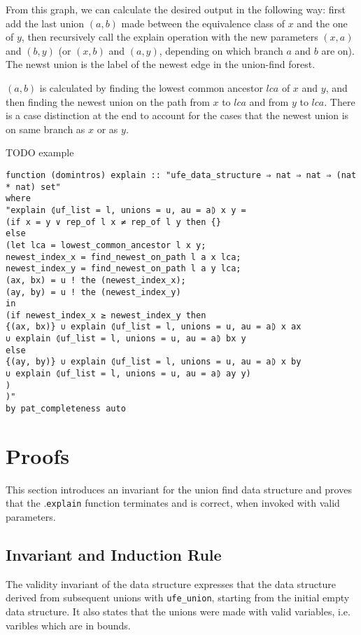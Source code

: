 From this graph, we can calculate the desired output in the following way: first add the last union $(a, b)$ made between the equivalence class of $x$ and the one of $y$, then recursively call the explain operation with the new parameters $(x, a)$ and $(b, y)$ (or $(x, b)$ and $(a, y)$, depending on which branch $a$ and $b$ are on). The newst union is the label of the newest edge in the union-find forest.

$(a, b)$ is calculated by finding the lowest common ancestor $lca$ of $x$ and $y$, and then finding the newest union on the path from $x$ to $lca$ and from $y$ to $lca$. There is a case distinction at the end to account for the cases that the newest union is on same branch as $x$ or as $y$.

TODO example

\begin{lstlisting}
function (domintros) explain :: "ufe_data_structure ⇒ nat ⇒ nat ⇒ (nat * nat) set"
where
"explain ⦇uf_list = l, unions = u, au = a⦈ x y = 
(if x = y ∨ rep_of l x ≠ rep_of l y then {}
else 
(let lca = lowest_common_ancestor l x y;
newest_index_x = find_newest_on_path l a x lca;
newest_index_y = find_newest_on_path l a y lca;
(ax, bx) = u ! the (newest_index_x);
(ay, by) = u ! the (newest_index_y)
in
(if newest_index_x ≥ newest_index_y then
{(ax, bx)} ∪ explain ⦇uf_list = l, unions = u, au = a⦈ x ax 
∪ explain ⦇uf_list = l, unions = u, au = a⦈ bx y
else 
{(ay, by)} ∪ explain ⦇uf_list = l, unions = u, au = a⦈ x by 
∪ explain ⦇uf_list = l, unions = u, au = a⦈ ay y)
)
)"
by pat_completeness auto
\end{lstlisting}

\section{Proofs}

This section introduces an invariant for the union find data structure and proves that the .\lstinline{explain} function terminates and is correct, when invoked with valid parameters.

\subsection{Invariant and Induction Rule}

The validity invariant of the data structure expresses that the data structure derived from subsequent unions with \lstinline{ufe_union}, starting from the initial empty data structure. 
It also states that the unions were made with valid variables, i.e. varibles which are in bounds.


